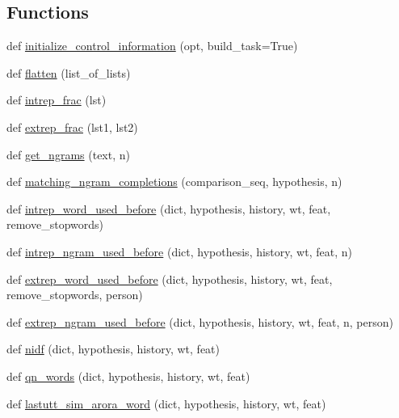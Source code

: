 \subsection*{Functions}
\begin{DoxyCompactItemize}
\item 
def \hyperlink{namespacecontrollable__seq2seq_1_1controls_a7c6540f026d763dbf534f1a3e60500a3}{initialize\+\_\+control\+\_\+information} (opt, build\+\_\+task=True)
\item 
def \hyperlink{namespacecontrollable__seq2seq_1_1controls_a7c34984d4b5df8732e5e8176bf1663e3}{flatten} (list\+\_\+of\+\_\+lists)
\item 
def \hyperlink{namespacecontrollable__seq2seq_1_1controls_a311eb502ed6cb93b69800a8a00ebc5e9}{intrep\+\_\+frac} (lst)
\item 
def \hyperlink{namespacecontrollable__seq2seq_1_1controls_ab7554c2785504a4bd181168ad30ba9e0}{extrep\+\_\+frac} (lst1, lst2)
\item 
def \hyperlink{namespacecontrollable__seq2seq_1_1controls_a3fad33534b785e9e43e2145199347e05}{get\+\_\+ngrams} (text, n)
\item 
def \hyperlink{namespacecontrollable__seq2seq_1_1controls_a4c775d3518037c2505c0bb4a69bb1dd5}{matching\+\_\+ngram\+\_\+completions} (comparison\+\_\+seq, hypothesis, n)
\item 
def \hyperlink{namespacecontrollable__seq2seq_1_1controls_af7cfe0f401279ee7fa767d05fcb81286}{intrep\+\_\+word\+\_\+used\+\_\+before} (dict, hypothesis, history, wt, feat, remove\+\_\+stopwords)
\item 
def \hyperlink{namespacecontrollable__seq2seq_1_1controls_ae0245f482c87ad27a92efebe1d95d607}{intrep\+\_\+ngram\+\_\+used\+\_\+before} (dict, hypothesis, history, wt, feat, n)
\item 
def \hyperlink{namespacecontrollable__seq2seq_1_1controls_ae434171bae1e0ae82095b6d54ad4cadd}{extrep\+\_\+word\+\_\+used\+\_\+before} (dict, hypothesis, history, wt, feat, remove\+\_\+stopwords, person)
\item 
def \hyperlink{namespacecontrollable__seq2seq_1_1controls_acce6374d8291de7af1df375285d65054}{extrep\+\_\+ngram\+\_\+used\+\_\+before} (dict, hypothesis, history, wt, feat, n, person)
\item 
def \hyperlink{namespacecontrollable__seq2seq_1_1controls_a06371a18df2fc3cc43efbbbacc94a0d5}{nidf} (dict, hypothesis, history, wt, feat)
\item 
def \hyperlink{namespacecontrollable__seq2seq_1_1controls_a2abfb0ac45f5c1d4a05c638ea1e354c1}{qn\+\_\+words} (dict, hypothesis, history, wt, feat)
\item 
def \hyperlink{namespacecontrollable__seq2seq_1_1controls_ae87a6983e2e8bfd8a5eaa33973c6acc3}{lastutt\+\_\+sim\+\_\+arora\+\_\+word} (dict, hypothesis, history, wt, feat)
\end{DoxyCompactItemize}
